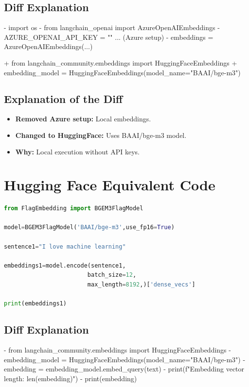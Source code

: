 \documentclass[11pt, a4paper]{article}
\begin{document}
\subsection{Diff Explanation}
\begin{removedcode}
\begin{diffverb}
- import os
- from langchain_openai import AzureOpenAIEmbeddings
- AZURE_OPENAI_API_KEY = "" ... (Azure setup)
- embeddings = AzureOpenAIEmbeddings(...)
\end{diffverb}
\end{removedcode}

\begin{addedcode}
\begin{diffverb}
+ from langchain_community.embeddings import HuggingFaceEmbeddings
+ embedding_model = HuggingFaceEmbeddings(model_name="BAAI/bge-m3")
\end{diffverb}
\end{addedcode}


\subsection{Explanation of the Diff}
\begin{itemize}
    \item \textbf{Removed Azure setup:} Local embeddings.
    \item \textbf{Changed to HuggingFace:} Uses BAAI/bge-m3 model.
    \item \textbf{Why:} Local execution without API keys.
\end{itemize}

\section{Hugging Face Equivalent Code}
\begin{lstlisting}[language=Python]
from FlagEmbedding import BGEM3FlagModel

model=BGEM3FlagModel('BAAI/bge-m3',use_fp16=True)

sentence1="I love machine learning"

embeddings1=model.encode(sentence1,
                        batch_size=12,
                        max_length=8192,)['dense_vecs']

print(embeddings1)
\end{lstlisting}

\subsection{Diff Explanation}
\begin{removedcode}
\begin{diffverb}
- from langchain_community.embeddings import HuggingFaceEmbeddings
- embedding_model = HuggingFaceEmbeddings(model_name="BAAI/bge-m3")
- embedding = embedding_model.embed_query(text)
- print(f"Embedding vector length: {len(embedding)}")
- print(embedding)
\end{diffverb}
\end{removedcode}
\end{document}
